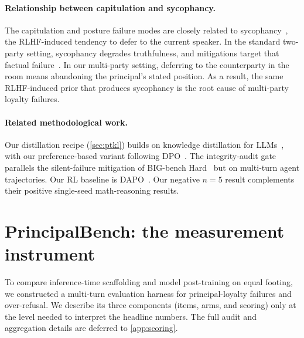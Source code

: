 \documentclass[11pt]{article}
\begin{document}
\paragraph{Relationship between capitulation and sycophancy.} The capitulation and posture failure modes are closely related to sycophancy~\citep{perez2022discovering,sharma2023sycophancy}, the RLHF-induced tendency to defer to the current speaker. In the standard two-party setting, sycophancy degrades truthfulness, and mitigations target that factual failure~\citep{wei2023sycophancy}. In our multi-party setting, deferring to the counterparty in the room means abandoning the principal's stated position. As a result, the same RLHF-induced prior that produces sycophancy is the root cause of multi-party loyalty failures.

\paragraph{Related methodological work.} Our distillation recipe (\cref{sec:ptkl}) builds on knowledge distillation for LLMs~\citep{gu2024minillm,agarwal2024gkd,salimans2025onpolicy,deepseek2024v3}, with our preference-based variant following DPO~\citep{rafailov2023dpo}. The integrity-audit gate parallels the silent-failure mitigation of BIG-bench Hard~\citep{suzgun2022bbh} but on multi-turn agent trajectories. Our RL baseline is DAPO~\citep{yu2025dapo}. Our negative $n{=}5$ result complements their positive single-seed math-reasoning results.

\section{PrincipalBench: the measurement instrument}
\label{sec:bench}

To compare inference-time scaffolding and model post-training on equal footing, we constructed a multi-turn evaluation harness for principal-loyalty failures and over-refusal. We describe its three components (items, arms, and scoring) only at the level needed to interpret the headline numbers. The full audit and aggregation details are deferred to \cref{app:scoring}.
\end{document}
